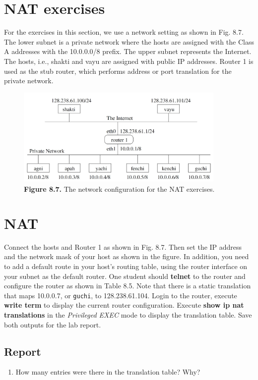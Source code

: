 \documentclass{../UTNetLab}
\begin{document}
\section*{NAT exercises}
    For the exercises in this section, we use a network setting as shown in Fig. 8.7. The lower subnet is a private network where the hosts are assigned with the Class A addresses with the 10.0.0.0/8 prefix. The upper subnet represents the Internet. The hosts, i.e., shakti and vayu are assigned with public IP addresses. Router 1 is used as the stub router, which performs address or port translation for the private network.
    \begin{figure}[H]
        \centering
        \includegraphics[width=0.9\textwidth]{img/fig1.png}
        \caption{\textbf{Figure 8.7.} The network configuration for the NAT exercises.}
        \label{fig:8.7}
    \end{figure}

\section{NAT}
    Connect the hosts and Router 1 as shown in Fig.
    8.7. Then set the IP address and the network mask of your host as shown in the figure.
    In addition, you need to add a default route in your host’s routing table, using the router interface on your subnet as the default router.
    One student should \textbf{telnet} to the router and configure the router as shown in Table 8.5. Note that there is a static translation that maps 10.0.0.7, or \texttt{guchi}, to 128.238.61.104.
    Login to the router, execute \textbf{write term} to display the current router configuration.
    Execute \textbf{show ip nat translations} in the \textit{Privileged EXEC} mode to display the translation table.
    Save both outputs for the lab report.\\
    \subsection*{Report}
    \begin{enumerate}
        \item How many entries were there in the translation table? Why?
    \end{enumerate}
    
\end{document}
